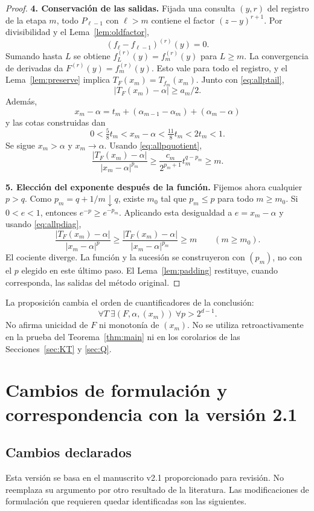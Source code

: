 \documentclass[11pt,a4paper]{article}
\numberwithin{equation}{section}
\theoremstyle{definition}
\theoremstyle{remark}
\newcommand{\paso}[1]{\par\smallskip\noindent\textbf{#1}\quad}
\begin{document}
\begin{proof}
\paso{4. Conservación de las salidas.}
Fijada una consulta $(y,r)$ del registro de la etapa $m$, todo $P_{\ell-1}$ con $\ell>m$ contiene el factor $(z-y)^{r+1}$. Por divisibilidad y el Lema~\ref{lem:oldfactor},
\[
(f_\ell-f_{\ell-1})^{(r)}(y)=0.
\]
Sumando hasta $L$ se obtiene $f_L^{(r)}(y)=f_m^{(r)}(y)$ para $L\ge m$. La convergencia de derivadas da $F^{(r)}(y)=f_m^{(r)}(y)$. Esto vale para todo el registro, y el Lema~\ref{lem:preserve} implica $T_F(x_m)=T_{f_m}(x_m)$. Junto con \eqref{eq:allptail},
\[
|T_F(x_m)-\alpha|\ge a_m/2.
\]
Además,
\[
x_m-\alpha=t_m+(\alpha_{m-1}-\alpha_m)+(\alpha_m-\alpha)
\]
y las cotas construidas dan
\[
0<\tfrac58t_m<x_m-\alpha<\tfrac{11}{8}t_m<2t_m<1.
\]
Se sigue $x_m>\alpha$ y $x_m\to\alpha$. Usando \eqref{eq:allpquotient},
\begin{equation}\label{eq:allpdiag}
\frac{|T_F(x_m)-\alpha|}{|x_m-\alpha|^{p_m}}
\ge\frac{c_m}{2^{p_m+1}}t_m^{q-p_m}\ge m.
\end{equation}

\paso{5. Elección del exponente después de la función.}
Fijemos ahora cualquier $p>q$. Como $p_m=q+1/m\downarrow q$, existe $m_0$ tal que $p_m\le p$ para todo $m\ge m_0$. Si $0<e<1$, entonces $e^{-p}\ge e^{-p_m}$. Aplicando esta desigualdad a $e=x_m-\alpha$ y usando \eqref{eq:allpdiag},
\[
\frac{|T_F(x_m)-\alpha|}{|x_m-\alpha|^p}
\ge\frac{|T_F(x_m)-\alpha|}{|x_m-\alpha|^{p_m}}
\ge m\qquad(m\ge m_0).
\]
El cociente diverge. La función y la sucesión se construyeron con $(p_m)$, no con el $p$ elegido en este último paso. El Lema~\ref{lem:padding} restituye, cuando corresponda, las salidas del método original.
\end{proof}

La proposición cambia el orden de cuantificadores de la conclusión:
\[
\forall T\ \exists(F,\alpha,(x_m))\ \forall p>2^{d-1}.
\]
No afirma unicidad de $F$ ni monotonía de $(x_m)$. No se utiliza retroactivamente en la prueba del Teorema~\ref{thm:main} ni en los corolarios de las Secciones~\ref{sec:KT} y \ref{sec:Q}.

\par\bigskip
\section{Cambios de formulación y correspondencia con la versión 2.1}\label{app:changes}

\subsection{Cambios declarados}
Esta versión se basa en el manuscrito v2.1 proporcionado para revisión. No reemplaza su argumento por otro resultado de la literatura. Las modificaciones de formulación que requieren quedar identificadas son las siguientes.
\end{document}
